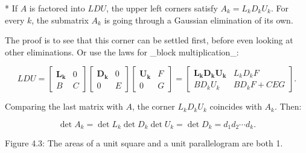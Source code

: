* If \(A\) is factored into \(LDU\), the upper left corners satisfy \(A_{k}=L_{k}D_{k}U_{k}\). For every \(k\), the submatrix \(A_{k}\) is going through a Gaussian elimination of its own.

The proof is to see that this corner can be settled first, before even looking at other eliminations. Or use the laws for _block multiplication_:

\[LDU=\begin{bmatrix}\textbf{L}_{\textbf{k}}&0\\ B&C\end{bmatrix}\begin{bmatrix}\textbf{D}_{\textbf{k}}&0\\ 0&E\end{bmatrix}\begin{bmatrix}\textbf{U}_{\textbf{k}}&F\\ 0&G\end{bmatrix}=\begin{bmatrix}\textbf{L}_{\textbf{k}}\textbf{D}_{\textbf{k} }\textbf{U}_{\textbf{k}}&L_{k}D_{k}F\\ BD_{k}U_{k}&BD_{k}F+CEG\end{bmatrix}.\]

Comparing the last matrix with \(A\), the corner \(L_{k}D_{k}U_{k}\) coincides with \(A_{k}\). Then:

\[\det A_{k}=\det L_{k}\det D_{k}\det U_{k}=\det D_{k}=d_{1}d_{2}\cdots d_{k}.\]

Figure 4.3: The areas of a unit square and a unit parallelogram are both 1.

 